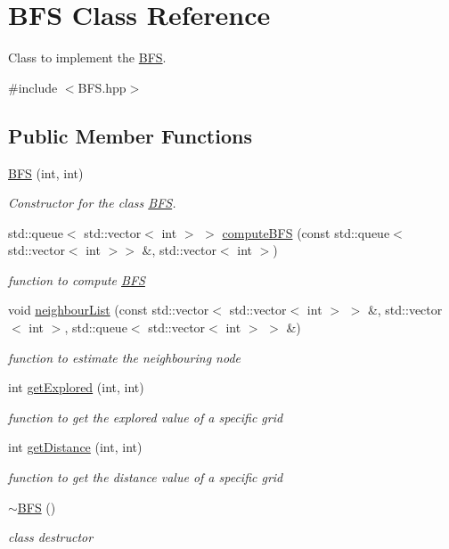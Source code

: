 \hypertarget{classBFS}{}\section{B\+FS Class Reference}
\label{classBFS}


Class to implement the \hyperlink{classBFS}{B\+FS}.  




{\ttfamily \#include $<$B\+F\+S.\+hpp$>$}

\subsection*{Public Member Functions}
\begin{DoxyCompactItemize}
\item 
\hyperlink{classBFS_aab80c2b3194c3c50281ed397e5fa82e1}{B\+FS} (int, int)
\begin{DoxyCompactList}\small\item\em Constructor for the class \hyperlink{classBFS}{B\+FS}. \end{DoxyCompactList}\item 
std\+::queue$<$ std\+::vector$<$ int $>$ $>$ \hyperlink{classBFS_a569f5936b7d708e928f6477548ffcdd2}{compute\+B\+FS} (const std\+::queue$<$ std\+::vector$<$ int $>$$>$ \&, std\+::vector$<$ int $>$)
\begin{DoxyCompactList}\small\item\em function to compute \hyperlink{classBFS}{B\+FS} \end{DoxyCompactList}\item 
void \hyperlink{classBFS_a099fc340466239bed3cb23bcf3c6eeae}{neighbour\+List} (const std\+::vector$<$ std\+::vector$<$ int $>$ $>$ \&, std\+::vector$<$ int $>$, std\+::queue$<$ std\+::vector$<$ int $>$ $>$ \&)
\begin{DoxyCompactList}\small\item\em function to estimate the neighbouring node \end{DoxyCompactList}\item 
int \hyperlink{classBFS_af170bc63c82b8e814df7fd6a035303cc}{get\+Explored} (int, int)
\begin{DoxyCompactList}\small\item\em function to get the explored value of a specific grid \end{DoxyCompactList}\item 
int \hyperlink{classBFS_a59c2fa43dd3f00bc0524d264338da1d5}{get\+Distance} (int, int)
\begin{DoxyCompactList}\small\item\em function to get the distance value of a specific grid \end{DoxyCompactList}\item 
\hyperlink{classBFS_a49eae2c37b1083d19f70640f0848b1cd}{$\sim$\+B\+FS} ()
\begin{DoxyCompactList}\small\item\em class destructor \end{DoxyCompactList}\end{DoxyCompactItemize}
